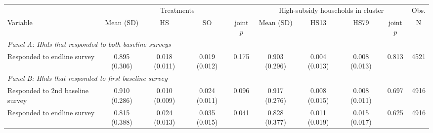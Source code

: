 \begin{tabular}{lccccccccc}
\hline\hline
 & \multicolumn{4}{c}{Treatments} & \multicolumn{4}{c}{High-subsidy households in cluster} & Obs. \\
Variable & Mean (SD) & HS & SO & joint $p$ & Mean (SD) & HS13 & HS79 & joint $p$ & N \\
\hline
\multicolumn{10}{l}{\textit{Panel A: Hhds that responded to both baseline surveys}} \\
Responded to endline survey & 0.895 (0.306) & 0.018 (0.011) & 0.019 (0.012) & 0.175 & 0.903 (0.296) & 0.004 (0.013) & 0.008 (0.013) & 0.813 & 4521 \\
\hline
\multicolumn{10}{l}{\textit{Panel B: Hhds that responded to first baseline survey}} \\
Responded to 2nd baseline survey & 0.910 (0.286) & 0.010 (0.009) & 0.024 (0.011) & 0.096 & 0.917 (0.276) & 0.008 (0.015) & 0.008 (0.011) & 0.697 & 4916 \\
Responded to endline survey & 0.815 (0.388) & 0.024 (0.013) & 0.035 (0.015) & 0.041 & 0.828 (0.377) & 0.011 (0.019) & 0.015 (0.017) & 0.625 & 4916 \\
\hline\hline
\end{tabular}
